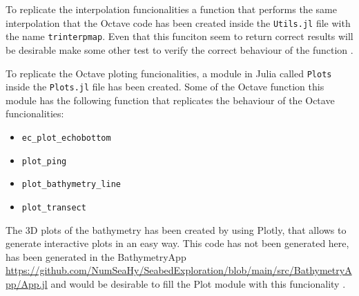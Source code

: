 \documentclass{article}[a4paper, 12pt]
\begin{document}

To replicate the interpolation funcionalities a function that performs the same interpolation that the Octave code has been created inside the \texttt{Utils.jl} file with the name \texttt{trinterpmap}. Even that this funciton seem to return correct results will be desirable make some other test to verify the correct behaviour of the function .

To replicate the Octave ploting funcionalities, a module in Julia called \texttt{Plots} inside the \texttt{Plots.jl} file has been created. Some of the Octave function this module has the following function that replicates the behaviour of the Octave funcionalities:

\begin{itemize}
    \item  \texttt{ec\_plot\_echobottom}
    \item \texttt{plot\_ping}
    \item \texttt{plot\_bathymetry\_line}
    \item \texttt{plot\_transect}
\end{itemize}

The 3D plots of the bathymetry has been created by using Plotly, that allows to generate interactive plots in an easy way. This code has not been generated here, has been generated in the BathymetryApp \url{https://github.com/NumSeaHy/SeabedExploration/blob/main/src/BathymetryApp/App.jl} and would be desirable to fill the Plot module with this funcionality . 
\end{document}
